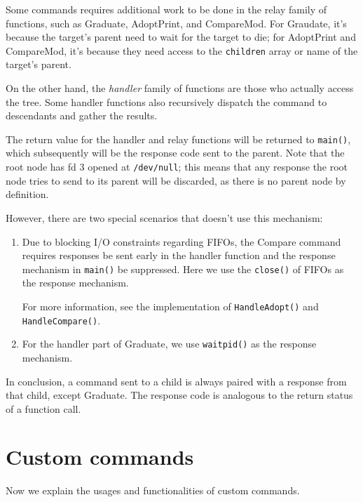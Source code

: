 \documentclass[12pt, a4paper]{article}
\begin{document}
  Some commands requires additional work to be done in the relay family of functions,
  such as Graduate, AdoptPrint, and CompareMod.
  For Graudate, it's because the target's parent need to wait for the target
  to die; for AdoptPrint and CompareMod, it's because they need access to the
  \verb|children| array or name of the target's parent.

  On the other hand, the \textit{handler} family of functions are those
  who actually access the tree. Some handler functions also recursively
  dispatch the command to descendants and gather the results.

  The return value for the handler and relay functions will be returned to
  \verb|main()|, which subsequently will be the response code sent to the parent.
  Note that the root node has fd 3 opened at \verb|/dev/null|; this means that
  any response the root node tries to send to its parent will be discarded, as
  there is no parent node by definition.

  \pagebreak
  However, there are two special scenarios that doesn't use this mechanism:\nobreak
  \begin{enumerate}
    \item Due to blocking I/O constraints regarding FIFOs, the Compare command
    requires responses be sent early in the handler function and the response mechanism
    in \verb|main()| be suppressed. Here we use the \verb|close()| of FIFOs as
    the response mechanism.

    For more information, see the implementation of \verb|HandleAdopt()| and
    \verb|HandleCompare()|.

    \item For the handler part of Graduate, we use \verb|waitpid()| as the response
    mechanism.
  \end{enumerate}

  In conclusion, a command sent to a child is always paired with a response
  from that child, except Graduate.
  The response code is analogous to the return status of a function call.

  \section{Custom commands}
  Now we explain the usages and functionalities of custom commands.
\end{document}
